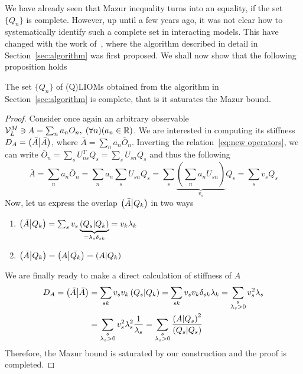 We have already seen that Mazur inequality turns into an equality, if the set \(\{Q_n\}\) is complete. However,
up until a few years ago, it was not clear how to systematically identify such a complete set in interacting models.
This have changed with the work of~\textcite{Mierzejewski2015a}, where the algorithm described in detail
in Section~\ref{sec:algorithm} was first proposed. We shall now show that the following proposition holds~\autocite{Mierzejewski2015Approx}
\begin{proposition}
  The set \(\{Q_n\}\) of (Q)LIOMs obtained from the algorithm in Section~\ref{sec:algorithm} is complete,
  that is it saturates the Mazur bound. 
\label{prop:saturation}
\end{proposition}
\begin{proof}
  Consider once again an arbitrary observable \(\mathcal{V}_L^M \ni A = \sum_n a_n O_n,\; 
  (\forall n) (a_n \in \mathbb{R})\). We are interested in computing its stiffness \(D_A = \left(\bar{A} \middle| \bar{A}\right)\), 
  where \(\bar{A} = \sum_n a_n \bar{O}_n\). Inverting the relation~\eqref{eq:new operators}, we can write 
  \(\bar{O}_n = \sum_s U_{ns}^T Q_s = \sum_s U_{sn} Q_s\) and thus the following
  \begin{equation*}
    \bar{A} = \sum_n a_n \bar{O}_n = \sum_n a_n \sum_s U_{sn} Q_s =
    \sum_s \underbrace{\left(\sum_n a_n U_{sn}\right)}_{v_s} Q_s = \sum_s v_s Q_s
  \end{equation*}
  Now, let us express the overlap \(\left(\bar{A} \middle| Q_k\right)\) in two ways
  \begin{enumerate}
    \item \(\left(\bar{A} \middle| Q_k\right) = \sum_s v_s \underbrace{\left(Q_s \middle| Q_k\right)}_{=\lambda_s \delta_{sk}} = v_k \lambda_k\)
    \item \(\left(\bar{A} \middle| Q_k\right) = \left(A \middle| \bar{Q_k}\right) = \left(A \middle| Q_k\right)\)
  \end{enumerate}
  We are finally ready to make a direct calculation of stiffness of \(A\)
  \begin{align*}
    D_A = \left(\bar{A} \middle| \bar{A}\right) &= \sum_{sk} v_s v_k \left(Q_s \middle| Q_k\right) = \sum_{sk} v_s v_k \delta_{sk} \lambda_{k} = 
    \sum_{\substack{s\\\lambda_s > 0}} v_s^2 \lambda_s \\
    &= \sum_{\substack{s\\\lambda_s > 0}} v_s^2 \lambda_s^2 \frac{1}{\lambda_s} = 
    \sum_{\substack{s\\\lambda_s > 0}} \frac{\left(A \middle| Q_s\right)^2}{\left(Q_s \middle| Q_s\right)}
  \end{align*}
  Therefore, the Mazur bound is saturated by our construction and the proof is completed.
\end{proof}
